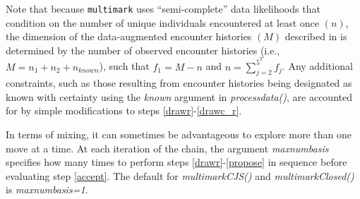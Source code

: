 \documentclass[12pt]{article}
\begin{document}
Note that because \verb|multimark| uses ``semi-complete'' data likelihoods that condition on the number of unique individuals encountered at least once $(n)$, the dimension of the data-augmented encounter histories $(M)$ described in \cite{McClintockEtAl2014} is determined by the number of observed encounter histories (i.e., $M=n_1+n_2+n_{known}$), such that $f_1=M-n$ and $n=\sum_{j=2}^{5^T} f_j$. Any additional constraints, such as those resulting from encounter histories being designated as known with certainty using the \textit{known} argument in \textit{processdata()}, are accounted for by simple modifications to steps \ref{drawr}-\ref{drawc_r}. 

In terms of mixing, it can sometimes be advantageous to explore more than one move at a time. At each iteration of the chain, the argument \textit{maxnumbasis} specifies how many times to perform steps \ref{drawr}-\ref{propose} in sequence before evaluating step \ref{accept}. The default for \textit{multimarkCJS()} and \textit{multimarkClosed()} is \textit{maxnumbasis=1}.



\end{document}
